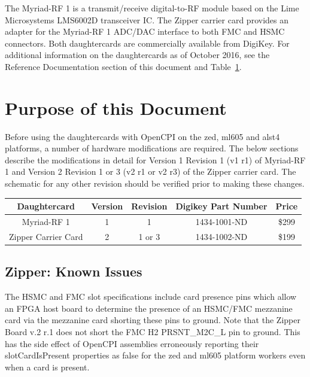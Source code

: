 \documentclass{article}
\begin{document}
\noindent The Myriad-RF 1 is a transmit/receive digital-to-RF module based on the Lime Microsystems LMS6002D transceiver IC. The Zipper carrier card provides an adapter for the Myriad-RF 1 ADC/DAC interface to both FMC and HSMC connectors. Both daughtercards are commercially available from DigiKey. For additional information on the daughtercards as of October 2016, see the Reference Documentation section of this document and Table~\ref{tab:version_info}.

\section*{Purpose of this Document}
Before using the daughtercards with OpenCPI on the zed, ml605 and alst4 platforms, a number of hardware modifications are required. The below sections describe the modifications in detail for Version 1 Revision 1 (v1 r1) of Myriad-RF 1 and Version 2 Revision 1 or 3 (v2 r1 or v2 r3) of the Zipper carrier card. The schematic for any other revision should be verified prior to making these changes.
		\begin{table}[h]
			\scriptsize
			\begin{center}
  				\begin{tabular}{|c|c|c|c|c|}
    			\hline
    			\rowcolor{blue}
    			Daughtercard & Version & Revision & Digikey Part Number & Price\\
    			\hline
    			Myriad-RF 1 & 1 & 1 & 1434-1001-ND & \$299\\
    			\hline
    			Zipper Carrier Card & 2 & 1 or 3 & 1434-1002-ND & \$199\\
    			\hline
   				\end{tabular}
   				\label{tab:version_info}
		  	\end{center}
   		\end{table}
\pagebreak

\normalsize
\subsection*{Zipper: Known Issues}
The HSMC and FMC slot specifications include card presence pins which allow an FPGA host board to determine the presence of an HSMC/FMC mezzanine card via the mezzanine card shorting these pins to ground. Note that the Zipper Board v.2 r.1 does not short the FMC H2 PRSNT\_M2C\_L pin to ground. This has the side effect of OpenCPI assemblies erroneously reporting their slotCardIsPresent properties as false for the zed and ml605 platform workers even when a card is present.\par\medskip
\end{document}

